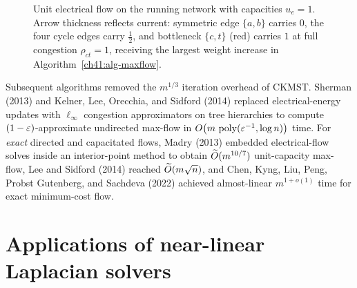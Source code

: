 \begin{figure}[htbp]
\centering
{}
\caption{Unit electrical flow on the running network with capacities $u_e = 1$. Arrow thickness reflects current: symmetric edge $\{a,b\}$ carries $0$, the four cycle edges carry $\tfrac{1}{2}$, and bottleneck $\{c,t\}$ (red) carries $1$ at full congestion $\rho_{ct} = 1$, receiving the largest weight increase in Algorithm~\ref{ch41:alg-maxflow}.}
\label{ch41:fig-maxflow-running}
\end{figure}

\begin{connectionbox}
Subsequent algorithms removed the $m^{1/3}$ iteration overhead of CKMST. Sherman (2013) and Kelner, Lee, Orecchia, and Sidford (2014) replaced electrical-energy updates with $\ell_\infty$ congestion approximators on tree hierarchies to compute $(1-\varepsilon)$-approximate undirected max-flow in $O\bigl(m\,\operatorname{poly}(\varepsilon^{-1},\log n)\bigr)$ time. For \emph{exact} directed and capacitated flows, Madry (2013) embedded electrical-flow solves inside an interior-point method to obtain $\widetilde{O}(m^{10/7})$ unit-capacity max-flow, Lee and Sidford (2014) reached $\widetilde{O}(m\sqrt{n})$, and Chen, Kyng, Liu, Peng, Probst Gutenberg, and Sachdeva (2022) achieved almost-linear $m^{1+o(1)}$ time for exact minimum-cost flow.
\end{connectionbox}

\section{Applications of near-linear Laplacian solvers}\label{ch41:hammer}

